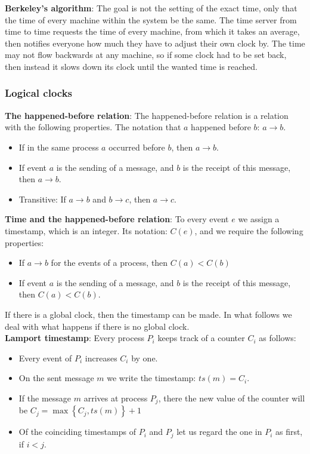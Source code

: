 \documentclass[margin=0px]{article}
\begin{document}
\noindent \textbf{Berkeley's algorithm}: The goal is not the setting of the exact time, only that the time of every machine within the system
be the same. The time server from time to time requests the time of every machine, from which it takes an average, then notifies everyone how much they
have to adjust their own clock by. The time may not flow backwards at any machine, so if some clock had to be set back,
then instead it slows down its clock until the wanted time is reached.

\subsubsection{Logical clocks}

\noindent \textbf{The happened-before relation}: The happened-before relation is a relation with the following properties.
The notation that $a$ happened before $b$: $a \to b$.

\begin{itemize}
    \item	If in the same process $a$ occurred before $b$, then $a \to b$.
    \item	If event $a$ is the sending of a message, and $b$ is the receipt of this message, then $a \to b$.
    \item	Transitive: If $a \to b$ and $b \to c$, then $a \to c$.
\end{itemize}

\noindent \textbf{Time and the happened-before relation}: To every event $e$ we assign a timestamp, which is an integer. Its notation:
$C(e)$, and we require the following properties:

\begin{itemize}
    \item	If $a \to b$ for the events of a process, then $C(a)<C(b)$
    \item	If event $a$ is the sending of a message, and $b$ is the receipt of this message, then $C(a)<C(b)$.
\end{itemize}

If there is a global clock, then the timestamp can be made. In what follows we deal with what happens if there is no global
clock.\\

\noindent \textbf{Lamport timestamp}: Every process $P_{i}$ keeps track of a counter $C_{i}$ as follows:
\begin{itemize}
    \item	Every event of $P_{i}$ increases $C_{i}$ by one.
    \item	On the sent message $m$ we write the timestamp: $ts(m) = C_{i}$.
    \item	If the message $m$ arrives at process $P_{j}$, there the new value of the counter
          will be $C_{j} = \max \left\{C_{j},ts(m)\right\}+1$
    \item	Of the coinciding timestamps of $P_{i}$ and $P_{j}$ let us regard the one in $P_{i}$ as first, if $i<j$.
\end{itemize}
\end{document}
